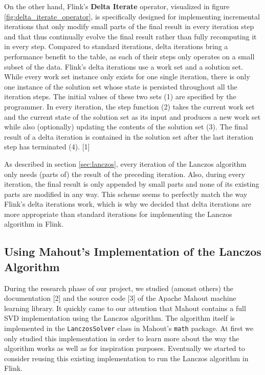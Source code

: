 On the other hand, Flink's \textbf{Delta Iterate} operator, visualized in figure 
\ref{fig:delta_iterate_operator}, is specifically designed for implementing incremental
iterations that only modify small parts of the final result in every iteration step and that 
thus continually evolve the final result rather than fully recomputing it in every step.
Compared to standard iterations, delta iterations bring a performance benefit to the table,
as each of their steps only operates on a small subset of the data. Flink's delta iterations
use a work set and a solution set. While every work set instance only exists for one single
iteration, there is only one instance of the solution set whose state is persisted throughout 
all the iteration steps. The initial values of these two sets (1) are specified by the 
programmer. In every iteration, the step function (2) takes the current work set and the current
state of the solution set as its input and produces a new work set while also (optionally)
updating the contents of the solution set (3). The final result of a delta iteration is
contained in the solution set after the last iteration step has terminated (4). [1]


As described in section \ref{sec:lanczos}, every iteration of the Lanczos algorithm only needs
(parts of) the result of the preceding iteration. Also, during every iteration, the final result
is only appended by small parts and none of its existing parts are modified in any way. This
scheme seems to perfectly match the way Flink's delta iterations work, which is why we decided
that delta iterations are more appropriate than standard iterations for implementing the Lanczos
algorithm in Flink.



\subsection{Using Mahout's Implementation of the Lanczos Algorithm}

During the research phase of our project, we studied (amonst others) the documentation [2] and
the source code [3] of the Apache Mahout machine learning library. It quickly came to our
attention that Mahout contains a full SVD implementation using the Lanczos algorithm. The
algorithm itself is implemented in the \texttt{LanczosSolver} class in Mahout's \texttt{math}
package. At first we only studied this implementation in order to learn more about the way the
algorithm works as well as for inspiration purposes. Eventually we started to consider reusing
this existing implementation to run the Lanczos algorithm in Flink.


